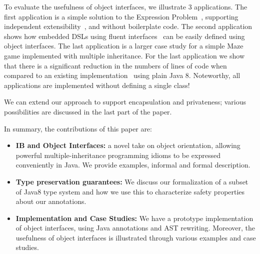 To evaluate the usefulness of object interfaces, we illustrate
3
applications. The first application is a simple 
solution to the Expression Problem~\cite{wadler98expression}, supporting independent 
extensibility~\cite{zenger05independentlyextensible}, and without boilerplate code. The second
application shows how embedded DSLs using fluent interfaces~\cite{fowler2005fluentinterface} 
can be easily defined using object interfaces. The last
application is a larger case study for a simple Maze game implemented with 
multiple inheritance. For the last application we show that there is a
significant reduction in the numbers of lines of code when compared 
to an existing implementation~\cite{bono14} using plain Java 8. 
Noteworthy, all applications are implemented 
without defining a single class!

We can extend our approach to support encapsulation and privateness;
various possibilities are discussed in the last part of the paper.


In summary, the contributions of this paper are:
\begin{itemize}

\item {\bf IB and Object Interfaces:} a novel take on object orientation, allowing
  powerful multiple-inheritance programming idioms to be expressed
  conveniently in Java. We provide examples, informal and formal description.

\item{\bf Type preservation guarantees:}
We discuss our formalization of a subset of Java8 type system and how we use this
to characterize safety properties about our annotations.

\item {\bf Implementation and Case Studies:} We have a prototype
  implementation of object interfaces, using Java
  annotations and AST rewriting. Moreover, the usefulness of object interfaces is
  illustrated through various examples and case studies.


\end{itemize}
